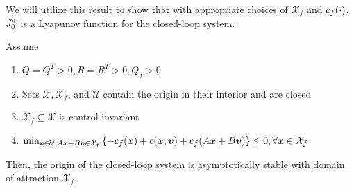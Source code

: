 We will utilize this result to show that with appropriate choices of $\mathcal{X}_f$ and $c_f(\cdot)$, $J_0^*$ is a Lyapunov function for the closed-loop system. 

\begin{theorem}
Assume 
\begin{enumerate}
    \item $Q = Q^T > 0, R = R^T >0, Q_f > 0$
    \item Sets $\mathcal{X}, \mathcal{X}_f$, and $\mathcal{U}$ contain the origin in their interior and are closed
    \item $\mathcal{X}_f \subseteq \mathcal{X}$ is control invariant
    \item $\min_{\bm{v} \in \mathcal{U}, A \bm{x} + B \bm{v} \in \mathcal{X}_f} \left\{ -c_f(\bm{x}) + c(\bm{x},\bm{v}) + c_f(A\bm{x} + B\bm{v}) \right\} \leq 0, \forall \bm{x} \in \mathcal{X}_f$.
\end{enumerate}
Then, the origin of the closed-loop system is asymptotically stable with domain of attraction $\mathcal{X}_f$.
\end{theorem}

